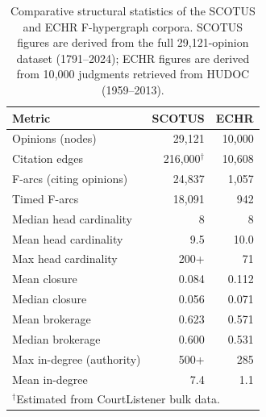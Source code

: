 \begin{table}[t]
\centering
\caption{Comparative structural statistics of the SCOTUS and ECHR
         F-hypergraph corpora. SCOTUS figures are derived from the full
         29{,}121-opinion dataset (1791--2024); ECHR figures are derived from
         10{,}000 judgments retrieved from HUDOC (1959--2013).}
\label{tab:scotus_echr_comparison}
\begin{tabular}{lrr}
\toprule
\textbf{Metric} & \textbf{SCOTUS} & \textbf{ECHR} \\
\midrule
Opinions (nodes) & 29{,}121 & 10{,}000 \\
Citation edges & 216{,}000$^{\dagger}$ & 10{,}608 \\
F-arcs (citing opinions) & 24{,}837 & 1{,}057 \\
Timed F-arcs & 18{,}091 & 942 \\
Median head cardinality & 8 & 8 \\
Mean head cardinality & 9.5 & 10.0 \\
Max head cardinality & 200+ & 71 \\
Mean closure & 0.084 & 0.112 \\
Median closure & 0.056 & 0.071 \\
Mean brokerage & 0.623 & 0.571 \\
Median brokerage & 0.600 & 0.531 \\
Max in-degree (authority) & 500+ & 285 \\
Mean in-degree & 7.4 & 1.1 \\
\bottomrule
\multicolumn{3}{l}{\footnotesize $^{\dagger}$Estimated from CourtListener bulk data.}
\end{tabular}
\end{table}
